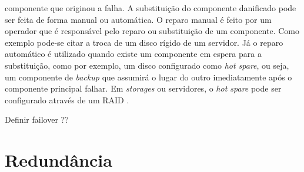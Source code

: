 \begin{itemize}
 componente que originou a falha. A substituição do componente danificado pode ser feita de forma manual ou automática. 
 O reparo manual é feito por um operador que é responsável pelo reparo ou substituição de um componente. Como exemplo pode-se citar
 a troca de um disco rígido de um servidor. Já o reparo automático é utilizado quando existe um componente em espera para a substituição, 
 como por exemplo, um disco configurado como \textit{hot spare}, ou seja, um componente de \textit{backup} que assumirá o lugar do 
 outro imediatamente após o componente principal falhar. Em \textit{storages} ou servidores, o \textit{hot spare} pode ser configurado 
 através de um \ac{RAID} \cite{rouse2013}.
\end{itemize}

Definir failover ??

\section{Redundância}
\label{section:redundancia}

